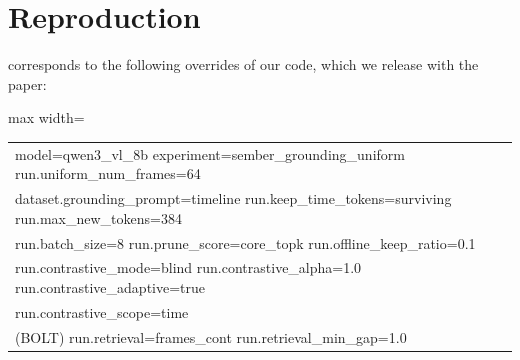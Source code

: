 \section{Reproduction}
\label{sec:suppl-repro}

\method corresponds to the following overrides of our code, which we release with the paper:
\begin{center}
\scriptsize\ttfamily
\begin{adjustbox}{max width=\linewidth}\begin{tabular}{l}
model=qwen3\_vl\_8b experiment=sember\_grounding\_uniform run.uniform\_num\_frames=64 \\
dataset.grounding\_prompt=timeline run.keep\_time\_tokens=surviving run.max\_new\_tokens=384 \\
run.batch\_size=8 run.prune\_score=core\_topk run.offline\_keep\_ratio=0.1 \\
run.contrastive\_mode=blind run.contrastive\_alpha=1.0 run.contrastive\_adaptive=true \\
run.contrastive\_scope=time \\
\textrm{(BOLT)} run.retrieval=frames\_cont run.retrieval\_min\_gap=1.0
\end{tabular}\end{adjustbox}
\end{center}
